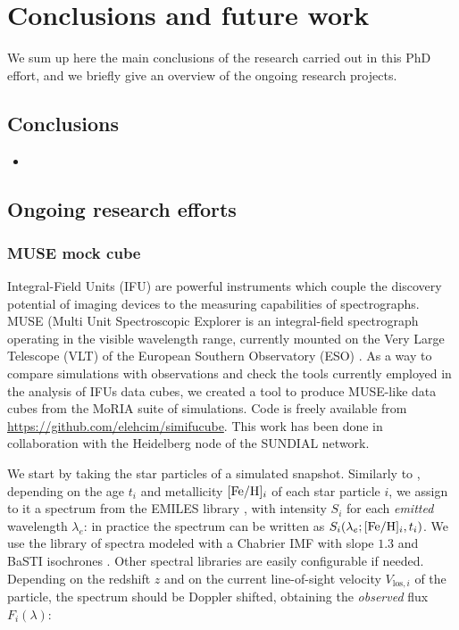 
\chapter{Conclusions and future work}
\label{ch:conclusions}
We sum up here the main conclusions of the research carried out in this PhD effort, and we briefly give an overview of the ongoing research projects.
\section{Conclusions}

\begin{itemize}
  \item
\end{itemize}

\section{Ongoing research efforts}
\subsection{MUSE mock cube}
Integral-Field Units (IFU) are powerful instruments which couple the discovery potential of imaging devices to the measuring capabilities of spectrographs.
MUSE (Multi Unit Spectroscopic Explorer is an integral-field spectrograph operating in the visible wavelength range, currently mounted on the Very Large Telescope (VLT) of the European Southern Observatory (ESO) \citep{Bacon2010, MUSEWebpage}.
As a way to compare simulations with observations and check the tools currently employed in the analysis of IFUs data cubes, we created a tool to produce MUSE-like data cubes from the MoRIA suite of simulations.
Code is freely available from \url{https://github.com/elehcim/simifucube}.
This work has been done in collaboration with the Heidelberg node of the SUNDIAL network.

We start by taking the star particles of a simulated snapshot.
Similarly to \citet{Ibarra-Medel2019}, depending on the age $t_i$ and metallicity $[\text{Fe}/\text{H}]_i$ of each star particle $i$, we assign to it a spectrum from the EMILES library \citep{Vazdekis2010}, with intensity $S_i$ for each \emph{emitted} wavelength $\lambda_e$: in practice the spectrum can be written as $S_i(\lambda_e;[\text{Fe}/\text{H}]_i, t_i)$.
We use the library of spectra modeled with a Chabrier IMF with slope $1.3$ and BaSTI isochrones \citep[][Bag of Stellar Tracks and Isochrones]{Pietrinferni2013}.
Other spectral libraries are easily configurable if needed.
Depending on the redshift $z$ and on the current line-of-sight velocity $V_{\mathrm{los},i}$ of the particle, the spectrum should be Doppler shifted, obtaining the \emph{observed} flux $F_i(\lambda)$:

